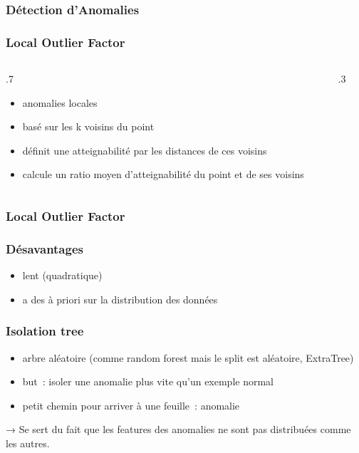 \documentclass{formation}
\begin{document}
\begin{frame}
  \frametitle{Détection d'Anomalies}
\end{frame}


\begin{frame}
  \frametitle{Local Outlier Factor}

  \begin{columns}
    \begin{column}{.7\tw}
      \begin{itemize}[<+->]
      \item anomalies locales
      \item basé sur les k voisins du point
      \item définit une \og atteignabilité\fg{} par les distances de
        ces voisins
      \item calcule un ratio moyen d'atteignabilité du point et de ses
        voisins
      \end{itemize}
    \end{column}
    \begin{column}{.3\tw}
    \end{column}
  \end{columns}
\end{frame}

\begin{frame}
  \frametitle{Local Outlier Factor}
\end{frame}

\begin{frame}
  \frametitle{Désavantages}
  \begin{itemize}
  \item lent (quadratique)
  \item a des à priori sur la distribution des données
  \end{itemize}
\end{frame}

\begin{frame}
  \frametitle{Isolation tree}
  \begin{itemize}
  \item arbre aléatoire (comme random forest mais le split est
    aléatoire, ExtraTree)
  \item but : isoler une anomalie plus vite qu'un exemple normal
  \item petit chemin pour arriver à une feuille : anomalie
  \end{itemize}

  → Se sert du fait que les features des anomalies ne sont pas
  distribuées comme les autres.
\end{frame}
\end{document}
